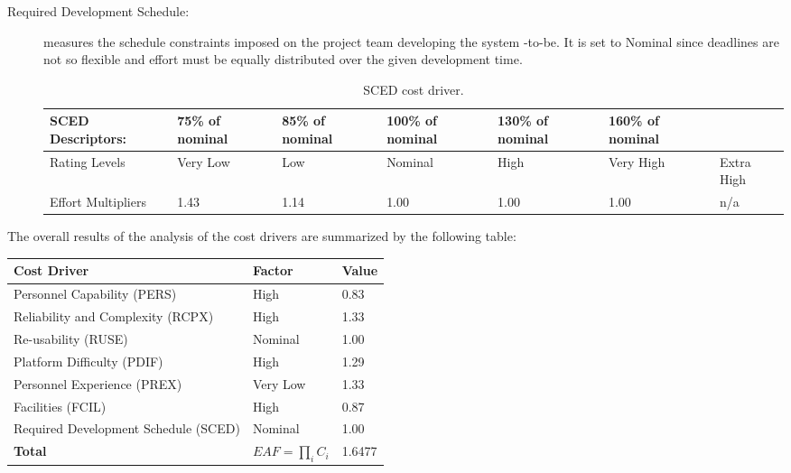 \begin{description}
\item[Required Development Schedule:] measures the schedule constraints imposed on the project team developing the system -to-be. It is set to Nominal since deadlines are not so flexible and effort must be equally distributed over the given development time.

\begin{table}[H]
	\begin{adjustwidth}{-.5in}{-.5in}
    \centering
    \begin{tabular}{p{3.6cm}|p{1.5cm}|p{1.5cm}|p{1.5cm}|p{1.5cm}|p{1.5cm}|p{1cm}}
    	\hline
        SCED Descriptors: & 75\% of nominal & 85\% of nominal & 100\% of nominal & 130\% of nominal & 160\% of nominal & \\
        \hline
        Rating Levels & Very Low & Low & Nominal & High & Very High & Extra High \\
        \hline
        Effort Multipliers & 1.43 & 1.14 & 1.00 & 1.00 & 1.00 & n/a \\
        \hline
    \end{tabular}
    \caption{SCED cost driver.}
    \end{adjustwidth}
\end{table}

\end{description}

\noindent
The overall results of the analysis of the cost drivers are summarized by the following table:

\begin{table}[H]
    \centering
    \begin{tabular}{l|l|l}
    	\hline
    	Cost Driver & Factor & Value \\
        \hline
        \hline
        Personnel Capability (PERS) & High & 0.83 \\
        \hline
        Reliability and Complexity (RCPX) & High & 1.33 \\
        \hline
        Re-usability (RUSE) & Nominal & 1.00 \\
        \hline
        Platform Difficulty (PDIF) & High & 1.29 \\
        \hline
        Personnel Experience (PREX) & Very Low & 1.33 \\
        \hline
        Facilities (FCIL) & High & 0.87 \\
        \hline
        Required Development Schedule (SCED) & Nominal & 1.00 \\
        \hline
        \textbf{Total}  & $EAF=\prod_i C_i$ & 1.6477 \\
        \hline
    \end{tabular}
\end{table}

